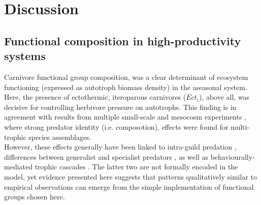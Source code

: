 \chapter{Discussion}
\label{chap:dis}
%
\section{Functional composition in high-productivity systems}
Carnivore functional group composition, was a clear determinant of ecosystem functioning (expressed as autotroph biomass density) in the aseasonal system. 
Here, the presence of ectothermic, iteroparous carnivores ($Ect_i$), above all, was decisive for controlling herbivore pressure on autotrophs. 
This finding is in agreement with results from multiple small-scale and mesocosm experiments \citep[e.g.][]{Finke2005, OConnor2008, Sanders2011}, where strong predator identity (i.e. composotion), effects were found for multi-trophic species assemblages.\\
However, these effects generally have been  linked to intra-guild predation \citep{Ives2005}, differences between  generalist and specialist predators \citep{Duffy2007}, as well as behaviourally-mediated trophic cascades \citep{Beschta2009, Schmitz2015}. 
The latter two are not formally encoded in the model, yet evidence presented here suggests that patterns qualitatively similar to empirical observations can emerge from the simple implementation of functional groups chosen here. 
